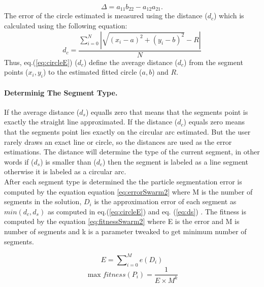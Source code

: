 \begin{equation}
\Delta  = a_{11}b_{22}-a_{12}a_{21}.
\end{equation}
 The error of the circle estimated is measured using the distance ($d_c$) which is calculated using the following equation:
 \begin{equation}
 \label{eq:circleE}
d_c  = \frac{{\sum\limits_{i = 0}^N {\left| {\sqrt {(x_i  - a)^2  + (y_i  - b)^2 }  - R} \right|} }}{N}
\end{equation}
Thus, eq.(\ref{eq:circleE}) ($d_c$) define the average distance ($d_c$) from the segment points ($x_i,y_i$) to the estimated fitted circle ($a,b$) and $R$.

\paragraph{Determinig The Segment Type.} 
\label{sec:DeterminigSegmentType}
If the average distance ($d_s$) equalls zero that means that the segments point is exactly the straight line approximated. If the distance ($d_c$) equals zero means that the segments point lies exactly on the circular arc estimated. But the user rarely draws an exact line or circle, so the distances are used as the error estimations. The distance will determine the type of the current segment, in other words if ($d_s$) is smaller than ($d_c$) then the segment is labeled as a line segment otherwise it is labeled as a circular arc. \\


After each segment type is determined the the particle segmentation error is computed by the equation equation \ref{eq:errorSwarm2} where M is the number of segments in the solution, $D_i$ is the  approximation error of each segment as $min(d_c,d_s)$ as computed in eq.(\ref{eq:circleE})  and eq. (\ref{eq:ds})  \cite{CruveDivisionSwarm}. The fitness is computed by the equation \ref{eq:fitnessSwarm2} where E is the error and M is number of segments and k is a parameter tweaked to get minimum number of segments.




 
 
\begin{equation}
E=\sum\nolimits_{i = 0}^M e(D_i) 
\label{eq:errorSwarm2}
\end{equation}
\begin{equation}
\max fitness(P_i ) = \frac{1}{{E \times M^k }}
\label{eq:fitnessSwarm2}
\end{equation}



